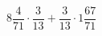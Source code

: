 \begin{ex}[type=calculate]
	\begin{condition}
		\( 8\dfrac{4}{71}\cdot\dfrac{3}{13}+\dfrac{3}{13}\cdot1\dfrac{67}{71} \)
	\end{condition}
	\answer{}
\end{ex}